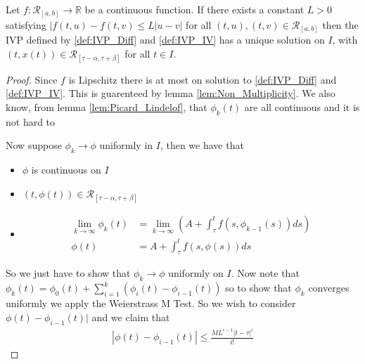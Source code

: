 \documentclass{unswmaths}
\begin{document}
\begin{unswlem}
	\label{lem:Picard_Lindelof}
	Let $ f : \mathcal{R}_{[a,b]} \longrightarrow \mathbb{R} $ be a continuous function. 
	If there exists a constant $ L > 0 $ satisfying $ |f(t,u) - f(t,v) \leq L|u-v| $ for all
	$ (t, u), (t,v) \in \mathcal{R}_{[a,b]} $ then the IVP defined by \eqref{def:IVP_Diff} and \eqref{def:IVP_IV} 
	has a unique solution on $ I $, with $ (t, x(t) ) \in \mathcal{R}_{[\tau - \alpha, \tau + \beta]} $ 
	for all $ t \in I $.
\end{unswlem}
\begin{proof}
	Since $ f $ is Lipschitz there is at most on solution to \eqref{def:IVP_Diff} and \eqref{def:IVP_IV}. This is
	guarenteed by lemma \ref{lem:Non_Multiplicity}. 
	We also know, from lemma \ref{lem:Picard_Lindelof}, that $ \phi_k(t) $ are all continuous and it is not hard to 
	
	Now suppose $ \phi_k \longrightarrow \phi $ uniformly in $ I $, then we have that
	\begin{itemize}
		\item $ \phi $ is continuous on $ I $ \\
		\item $ (t, \phi(t)) \in \mathcal{R}_{[\tau-\alpha, \tau + \beta]} $
		\item 	\begin{align*}
				\lim_{k \longrightarrow \infty} \phi_k (t) 	&= \lim_{k \longrightarrow \infty} \left( A + \int_\tau^t f(s,\phi_{k-1}(s))ds \right) \\
				\phi(t)						&= A + \int_\tau^t f(s, \phi(s)) ds
			\end{align*}
	\end{itemize}
	So we just have to show that $ \phi_k \longrightarrow \phi $ uniformly on $ I $.
	Now note that 
	$ \phi_k(t) = \phi_0(t) + \sum_{i=1}^k (\phi_i(t) - \phi_{i-1}(t)) $
	so to show that $ \phi_k $ converges uniformly we apply the Weierstrass M Test. 
	So we wish to consider $ \phi(t) - \phi_{i-1}(t)| $ and we claim that 
	\begin{align}
		\label{eq:Picard_Lindelof_Ineq}
		| \phi(t) - \phi_{i-1}(t)| \leq \frac{ML^{i-1} |t - \tau|^i}{i!}
	\end{align}
	

\end{proof}
\end{document}
